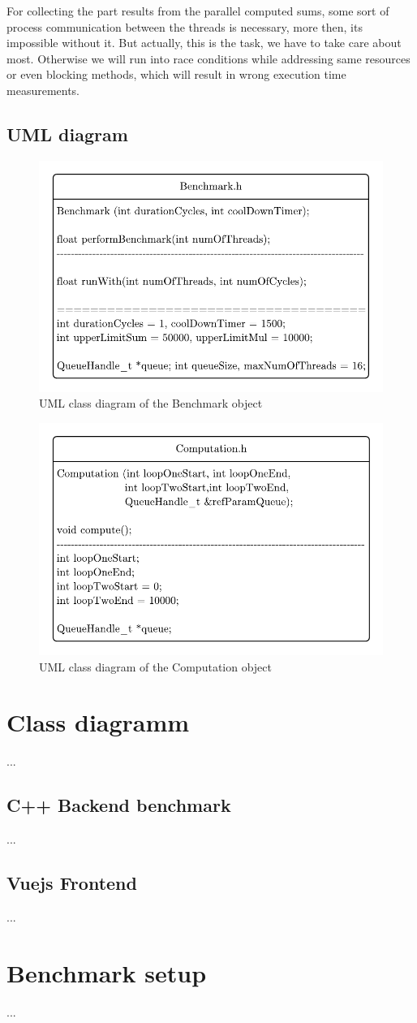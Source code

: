 For collecting the part results from the parallel computed sums, some sort of process communication between the threads is necessary, more then, its impossible without it. But actually, this is the task, we have to take care about most. Otherwise we will run into race conditions while addressing same resources or even blocking methods, which will result in wrong execution time measurements.

\newpage

\subsection{UML diagram}

\begin{figure}[htbp]
	\centerline{\includegraphics[width=.6\linewidth]{images/Benchmark-UML.pdf}}
	\caption{ UML class diagram of the Benchmark object }
	\label{fig:benchUML}
\end{figure}

\begin{figure}[htbp]
	\centerline{\includegraphics[width=.6\linewidth]{images/Computation-UML.pdf}}
	\caption{ UML class diagram of the Computation object }
	\label{fig:compUML}
\end{figure}

\newpage

\section{Class diagramm}

...

\subsection{C++ Backend benchmark}

...

\subsection{Vuejs Frontend}

...\newpage

\section{Benchmark setup}

...
